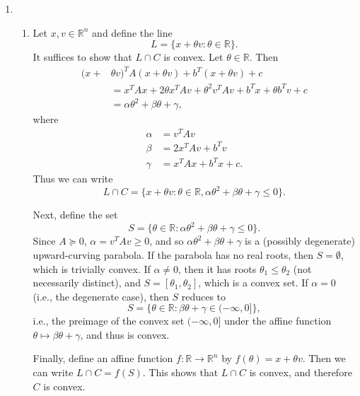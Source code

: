 \documentclass[letterpaper,12pt]{article}
\begin{document}
\begin{enumerate}
\item
\begin{enumerate}
\item Let $x, v \in \mathbb{R}^n$ and define the line
  \begin{equation*}
    L = \{x + \theta v : \theta \in \mathbb{R}\}.
  \end{equation*}
  It suffices to show that $L \cap C$ is convex. Let
  $\theta \in \mathbb{R}$. Then
  \begin{align*}
    (x +& \theta v)^T A (x + \theta v) + b^T (x + \theta v) + c \\
      &= x^T Ax + 2\theta x^T Av + \theta^2 v^T Av + b^T x + \theta b^T v + c \\
      &= \alpha \theta^2 + \beta \theta + \gamma,
  \end{align*}
  where
  \begin{align*}
    \alpha &= v^T Av \\
    \beta &= 2x^T Av + b^T v \\
    \gamma &= x^T Ax + b^T x + c.
  \end{align*}
  Thus we can write
  \begin{equation*}
    L \cap C = \{x + \theta v : \theta \in \mathbb{R},
      \alpha \theta^2 + \beta \theta + \gamma \leq 0\}.
  \end{equation*}

  Next, define the set
  \begin{equation*}
    S = \{\theta \in \mathbb{R}
      : \alpha \theta^2 + \beta \theta + \gamma \leq 0\}.
  \end{equation*}
  Since $A \succeq 0$, $\alpha = v^T Av \geq 0$, and so
  $\alpha \theta^2 + \beta \theta + \gamma$ is a (possibly degenerate)
  upward-curving parabola. If the parabola has no real roots, then
  $S = \emptyset$, which is trivially convex. If $\alpha \neq 0$, then
  it has roots $\theta_1 \leq \theta_2$ (not necessarily distinct),
  and $S = [\theta_1, \theta_2]$, which is a convex set. If
  $\alpha = 0$ (i.e., the degenerate case), then $S$ reduces to
  \begin{equation*}
    S = \{\theta \in \mathbb{R} : \beta \theta + \gamma \in (-\infty, 0]\},
  \end{equation*}
  i.e., the preimage of the convex set $(-\infty, 0]$ under the affine
  function $\theta \mapsto \beta \theta + \gamma$, and thus is convex.

  Finally, define an affine function $f : \mathbb{R} \to \mathbb{R}^n$ by
  $f(\theta) = x + \theta v$. Then we can write $L \cap C =
  f(S)$. This shows that $L \cap C$ is convex, and therefore $C$ is
  convex.


\end{enumerate}
\end{enumerate}
\end{document}
